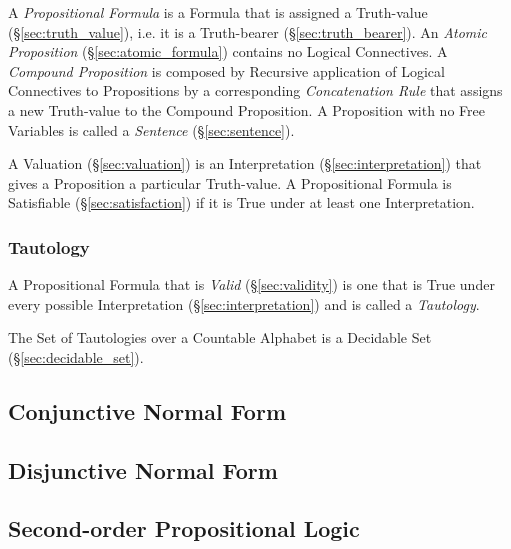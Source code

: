 A \emph{Propositional Formula} is a Formula that is assigned a
Truth-value (\S\ref{sec:truth_value}), i.e. it is a Truth-bearer
(\S\ref{sec:truth_bearer}). An \emph{Atomic Proposition}
(\S\ref{sec:atomic_formula}) contains no Logical Connectives. A
\emph{Compound Proposition} is composed by Recursive application of
Logical Connectives to Propositions by a corresponding
\emph{Concatenation Rule} that assigns a new Truth-value to the
Compound Proposition. A Proposition with no Free Variables is called a
\emph{Sentence} (\S\ref{sec:sentence}).

A Valuation (\S\ref{sec:valuation}) is an Interpretation
(\S\ref{sec:interpretation}) that gives a Proposition a particular
Truth-value. A Propositional Formula is Satisfiable
(\S\ref{sec:satisfaction}) if it is True under at least one
Interpretation.



\subsubsection{Tautology}\label{sec:tautology}

A Propositional Formula that is \emph{Valid} (\S\ref{sec:validity}) is
one that is True under every possible Interpretation
(\S\ref{sec:interpretation}) and is called a \emph{Tautology}.

The Set of Tautologies over a Countable Alphabet is a Decidable Set
(\S\ref{sec:decidable_set}).



\subsection{Conjunctive Normal Form}\label{sec:conjunctive_form}

\subsection{Disjunctive Normal Form}\label{sec:disjunctive_form}

\subsection{Second-order Propositional Logic}
\label{sec:secondorder_propositional_logic}

